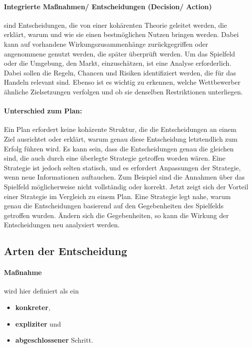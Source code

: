 \paragraph{Integrierte Maßnahmen/ Entscheidungen (Decision/ Action)} sind Entscheidungen, die von einer kohärenten Theorie geleitet werden, die erklärt, warum und wie sie einen bestmöglichen Nutzen bringen werden. Dabei kann auf vorhandene Wirkungszusammenhänge zurückgegriffen oder angenommene genutzt werden, die später überprüft werden. Um das Spielfeld oder die Umgebung, den Markt, einzuschätzen, ist eine Analyse erforderlich. Dabei sollen die Regeln, Chancen und Risiken identifiziert werden, die für das Handeln relevant sind. Ebenso ist es wichtig zu erkennen, welche Wettbewerber ähnliche Zielsetzungen verfolgen und ob sie denselben Restriktionen unterliegen.

\paragraph{Unterschied zum Plan:} Ein Plan erfordert keine kohärente Struktur, die die Entscheidungen an einem Ziel ausrichtet oder erklärt, warum genau diese Entscheidung letztendlich zum Erfolg führen wird. Es kann sein, dass die Entscheidungen genau die gleichen sind, die auch durch eine überlegte Strategie getroffen worden wären. Eine Strategie ist jedoch selten statisch, und es erfordert Anpassungen der Strategie, wenn neue Informationen auftauchen. Zum Beispiel sind die Annahmen über das Spielfeld möglicherweise nicht vollständig oder korrekt. Jetzt zeigt sich der Vorteil einer Strategie im Vergleich zu einem Plan. Eine Strategie legt nahe, warum genau die Entscheidungen basierend auf den Gegebenheiten des Spielfelds getroffen wurden. Ändern sich die Gegebenheiten, so kann die Wirkung der Entscheidungen neu analysiert werden.

\subsection{Arten der Entscheidung}


\paragraph{Maßnahme} wird hier definiert als ein

\begin{itemize}
	\item \textbf{konkreter},
	\item \textbf{expliziter} und
	\item \textbf{abgeschlossener} Schritt.
\end{itemize}

